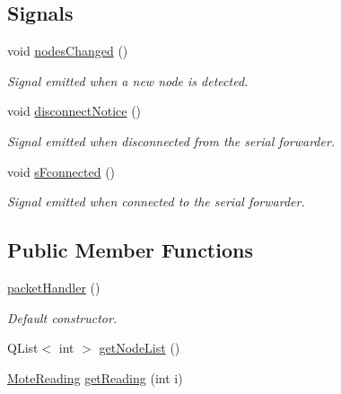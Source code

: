 \subsection*{Signals}
\begin{DoxyCompactItemize}
\item 
\hypertarget{classpacketHandler_a0e8f4d081f531b5e568c052f5b8babb9}{
void \hyperlink{classpacketHandler_a0e8f4d081f531b5e568c052f5b8babb9}{nodesChanged} ()}
\label{classpacketHandler_a0e8f4d081f531b5e568c052f5b8babb9}

\begin{DoxyCompactList}\small\item\em Signal emitted when a new node is detected. \item\end{DoxyCompactList}\item 
\hypertarget{classpacketHandler_a033895b001ec68791c5d0872df03e626}{
void \hyperlink{classpacketHandler_a033895b001ec68791c5d0872df03e626}{disconnectNotice} ()}
\label{classpacketHandler_a033895b001ec68791c5d0872df03e626}

\begin{DoxyCompactList}\small\item\em Signal emitted when disconnected from the serial forwarder. \item\end{DoxyCompactList}\item 
\hypertarget{classpacketHandler_ad3e95ebbb80274b826502fb84f8f100b}{
void \hyperlink{classpacketHandler_ad3e95ebbb80274b826502fb84f8f100b}{sFconnected} ()}
\label{classpacketHandler_ad3e95ebbb80274b826502fb84f8f100b}

\begin{DoxyCompactList}\small\item\em Signal emitted when connected to the serial forwarder. \item\end{DoxyCompactList}\end{DoxyCompactItemize}
\subsection*{Public Member Functions}
\begin{DoxyCompactItemize}
\item 
\hyperlink{classpacketHandler_a02936b9105618ed38701274efcfa0dfb}{packetHandler} ()
\begin{DoxyCompactList}\small\item\em Default constructor. \item\end{DoxyCompactList}\item 
QList$<$ int $>$ \hyperlink{classpacketHandler_a7d07166d577b014234ad311599ac3291}{getNodeList} ()
\item 
\hyperlink{classMoteReading}{MoteReading} \hyperlink{classpacketHandler_aec6fa94602daa18227491b76001152cb}{getReading} (int i)
\end{DoxyCompactItemize}


